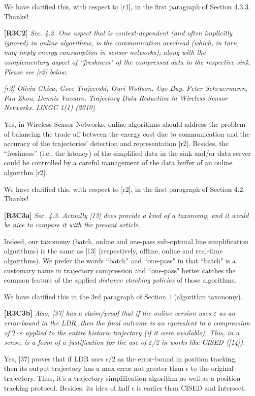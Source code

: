 \documentclass{letter}
\begin{document}
We have clarified this, with respect to [r1], in the first paragraph of Section 4.3.3. Thanks!

\textbf{[R3C2]} \emph{
Sec. 4.2. One aspect that is context-dependent (and often implicitly ignored) in online algorithms, is the communication overhead (which, in turn, may imply energy consumption in sensor networks); along with the complementary aspect of ``freshness" of the compressed data in the respective sink. Please see [r2] below.}

\emph{[r2] Oliviu Ghica, Goce Trajcevski, Ouri Wolfson, Ugo Buy, Peter Scheuermann, Fan Zhou, Dennis Vaccaro: Trajectory Data Reduction in Wireless Sensor Networks. IJNGC 1(1) (2010)
}

{Yes, in Wireless Sensor Networks, online algorithms should address the problem of balancing the trade-off between the energy cost due to communication and the accuracy of the trajectories’ detection and representation [r2].} Besides, the ``freshness” (i.e., the latency) of the simplified data in the sink and/or data server could be controlled by a careful management of the data buffer of an online algorithm [r2].

We have clarified this, with respect to [r2], in the first paragraph of Section 4.2. 
Thanks!

\textbf{[R3C3a]} \emph{
Sec. 4.3. Actually [13] does provide a kind of a taxonomy, and it would be nice to compare it with the present article. }

Indeed, our taxonomy (batch, online and one-pass sub-optimal line simplification algorithms) is the same as [13] (respectively, offline, online and real-time algorithms). 
We prefer the words ``batch" and ``one-pass" in that ``batch" is a customary name in trajectory compression and ``one-pass" better catches the common feature of the applied \emph{distance checking policies} of those algorithms.  

We have clarified this in the 3rd paragraph of Section 1 (algorithm taxonomy). 

\textbf{[R3C3b]} \emph{Also, [37] has a claim/proof that if the online version uses $\varepsilon$ as an error-bound in the LDR, then the final outcome is an equivalent to a compression of $2 \cdot \varepsilon$ applied to the entire historic trajectory (if it were available). This, in a sense, is a form of a justification for the use of $\varepsilon$/2 in works like CISED ([14]).}

{Yes, [37] proves that if LDR uses $\epsilon/2$ as the error-bound in position tracking, then its output trajectory has a max error not greater than $\epsilon$ to the original trajectory. Thus, it's a trajectory simplification algorithm as well as a position tracking protocol.} Besides, its idea of half $\epsilon$ is earlier than CISED and Intersect.
\end{document}
